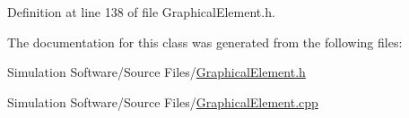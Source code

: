 Definition at line 138 of file Graphical\+Element.\+h.



The documentation for this class was generated from the following files\+:\begin{DoxyCompactItemize}
\item 
Simulation Software/\+Source Files/\hyperlink{_graphical_element_8h}{Graphical\+Element.\+h}\item 
Simulation Software/\+Source Files/\hyperlink{_graphical_element_8cpp}{Graphical\+Element.\+cpp}\end{DoxyCompactItemize}
